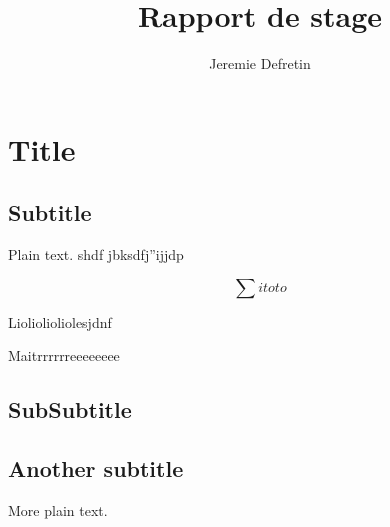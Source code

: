 \documentclass{article}
\title{Rapport de stage}
\author{Jeremie Defretin}
\begin{document}
 
\maketitle

\section{Title}

\subsection{Subtitle}

Plain text. shdf jbksdfj''ijjdp

$$ \sum{i}{toto} $$

Lioliolioliolesjdnf

Maitrrrrrreeeeeeee

\subsection{SubSubtitle}


\subsection{Another subtitle}

More plain text.
\end{document}
